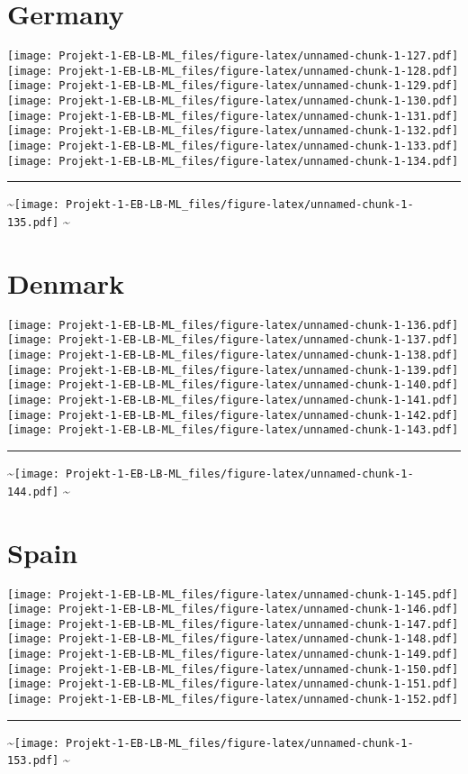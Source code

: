 \documentclass[]{article}
\begin{document}
\section{Germany}\label{germany}

\texttt{[image: Projekt-1-EB-LB-ML\_files/figure-latex/unnamed-chunk-1-127.pdf]}
\texttt{[image: Projekt-1-EB-LB-ML\_files/figure-latex/unnamed-chunk-1-128.pdf]}
\texttt{[image: Projekt-1-EB-LB-ML\_files/figure-latex/unnamed-chunk-1-129.pdf]}
\texttt{[image: Projekt-1-EB-LB-ML\_files/figure-latex/unnamed-chunk-1-130.pdf]}
\texttt{[image: Projekt-1-EB-LB-ML\_files/figure-latex/unnamed-chunk-1-131.pdf]}
\texttt{[image: Projekt-1-EB-LB-ML\_files/figure-latex/unnamed-chunk-1-132.pdf]}
\texttt{[image: Projekt-1-EB-LB-ML\_files/figure-latex/unnamed-chunk-1-133.pdf]}
\texttt{[image: Projekt-1-EB-LB-ML\_files/figure-latex/unnamed-chunk-1-134.pdf]}
\bigskip\hrule\bigskip
\textasciitilde{}\hfill\texttt{[image: Projekt-1-EB-LB-ML\_files/figure-latex/unnamed-chunk-1-135.pdf]}
\hfill \textasciitilde{} \vfill\eject

\section{Denmark}\label{denmark}

\texttt{[image: Projekt-1-EB-LB-ML\_files/figure-latex/unnamed-chunk-1-136.pdf]}
\texttt{[image: Projekt-1-EB-LB-ML\_files/figure-latex/unnamed-chunk-1-137.pdf]}
\texttt{[image: Projekt-1-EB-LB-ML\_files/figure-latex/unnamed-chunk-1-138.pdf]}
\texttt{[image: Projekt-1-EB-LB-ML\_files/figure-latex/unnamed-chunk-1-139.pdf]}
\texttt{[image: Projekt-1-EB-LB-ML\_files/figure-latex/unnamed-chunk-1-140.pdf]}
\texttt{[image: Projekt-1-EB-LB-ML\_files/figure-latex/unnamed-chunk-1-141.pdf]}
\texttt{[image: Projekt-1-EB-LB-ML\_files/figure-latex/unnamed-chunk-1-142.pdf]}
\texttt{[image: Projekt-1-EB-LB-ML\_files/figure-latex/unnamed-chunk-1-143.pdf]}
\bigskip\hrule\bigskip
\textasciitilde{}\hfill\texttt{[image: Projekt-1-EB-LB-ML\_files/figure-latex/unnamed-chunk-1-144.pdf]}
\hfill \textasciitilde{} \vfill\eject

\section{Spain}\label{spain}

\texttt{[image: Projekt-1-EB-LB-ML\_files/figure-latex/unnamed-chunk-1-145.pdf]}
\texttt{[image: Projekt-1-EB-LB-ML\_files/figure-latex/unnamed-chunk-1-146.pdf]}
\texttt{[image: Projekt-1-EB-LB-ML\_files/figure-latex/unnamed-chunk-1-147.pdf]}
\texttt{[image: Projekt-1-EB-LB-ML\_files/figure-latex/unnamed-chunk-1-148.pdf]}
\texttt{[image: Projekt-1-EB-LB-ML\_files/figure-latex/unnamed-chunk-1-149.pdf]}
\texttt{[image: Projekt-1-EB-LB-ML\_files/figure-latex/unnamed-chunk-1-150.pdf]}
\texttt{[image: Projekt-1-EB-LB-ML\_files/figure-latex/unnamed-chunk-1-151.pdf]}
\texttt{[image: Projekt-1-EB-LB-ML\_files/figure-latex/unnamed-chunk-1-152.pdf]}
\bigskip\hrule\bigskip
\textasciitilde{}\hfill\texttt{[image: Projekt-1-EB-LB-ML\_files/figure-latex/unnamed-chunk-1-153.pdf]}
\hfill \textasciitilde{} \vfill\eject
\end{document}

